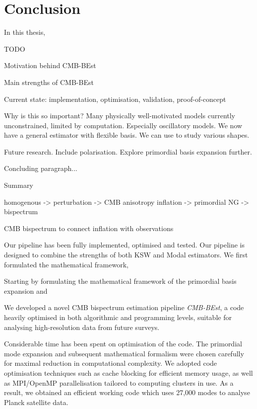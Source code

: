 \chapter{Conclusion}



In this thesis,


TODO

Motivation behind CMB-BEst

Main strengths of CMB-BEst

Current state: implementation, optimisation, validation, proof-of-concept

Why is this so important? Many physically well-motivated models currently unconstrained, limited by computation. Especially oscillatory models. We now have a general estimator with flexible basis. We can use to study various shapes.

Future research. Include polarisation. Explore primordial basis expansion further.

Concluding paragraph... 


Summary


homogenous -> perturbation -> CMB anisotropy
inflation -> primordial NG -> bispectrum

CMB bispectrum to connect inflation with observations

Our pipeline has been fully implemented, optimised and tested.
Our pipeline is designed to combine the strengths of both KSW and Modal estimators. We first formulated the mathematical framework, 

Starting by formulating the mathematical framework of the primordial basis expansion and 

We developed a novel CMB bispectrum estimation pipeline \textit{CMB-BEst}, a code heavily optimised in both algorithmic and programming levels, suitable for analysing high-resolution data from future surveys.

Considerable time has been spent on optimisation of the code. The primordial mode expansion and subsequent mathematical formalism were chosen carefully for maximal reduction in computational complexity. We adopted code optimisation techniques such as cache blocking for efficient memory usage, as well as MPI/OpenMP parallelisation tailored to computing clusters in use. As a result, we obtained an efficient working code which uses 27,000 modes to analyse Planck satellite data.

